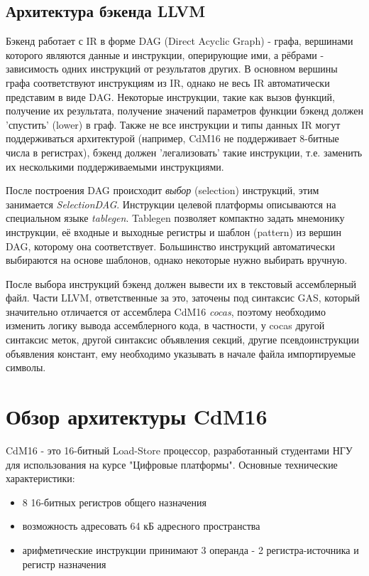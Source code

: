 \documentclass[a4paper,14pt]{extarticle}
\begin{document}
\subsection{Архитектура бэкенда LLVM}

Бэкенд работает с IR в форме DAG (Direct Acyclic Graph) - графа, вершинами которого являются данные и инструкции, оперирующие  ими, а рёбрами - зависимость одних инструкций от результатов других. В основном вершины графа соответствуют инструкциям из IR, однако не весь IR автоматически представим в виде DAG. Некоторые инструкции, такие как вызов функций, получение их результата, получение значений параметров функции бэкенд должен 'спустить' (lower) в граф. Также не все инструкции и типы данных IR могут поддерживаться архитектурой (например, CdM16 не поддерживает 8-битные числа в регистрах), бэкенд должен 'легализовать' такие инструкции, т.е. заменить их несколькими поддерживаемыми инструкциями.

После построения DAG происходит \emph{выбор} (selection) инструкций, этим занимается \emph{SelectionDAG}. Инструкции целевой платформы описываются на специальном языке \emph{tablegen}. Tablegen позволяет компактно задать мнемонику инструкции, её входные и выходные регистры и шаблон (pattern) из вершин DAG, которому она соответствует. Большинство инструкций автоматически выбираются на основе шаблонов, однако некоторые нужно выбирать вручную.

После выбора инструкций бэкенд должен вывести их в текстовый ассемблерный файл. Части LLVM, ответственные за это, заточены под синтаксис GAS, который значительно отличается от ассемблера CdM16 \emph{cocas}, поэтому  необходимо изменить логику вывода ассемблерного кода, в частности, у cocas другой синтаксис меток,  другой синтаксис объявления секций, другие псевдоинструкции объявления констант,  ему необходимо указывать в начале файла импортируемые символы.


\pagebreak
\section{Обзор архитектуры CdM16}
CdM16 - это 16-битный Load-Store процессор, разработанный студентами НГУ для использования на курсе "Цифровые платформы"\cite{cdm:slides}. Основные технические характеристики:
\begin{itemize}
	\item 8 16-битных регистров общего назначения
	\item возможность адресовать 64 кБ адресного пространства
	\item арифметические инструкции принимают 3 операнда - 2 регистра-источника и регистр назначения
\end{itemize}
\end{document}
